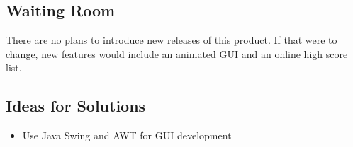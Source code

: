 \subsection{Waiting Room}
There are no plans to introduce new releases of this product. If that were to change, new features would include 
an animated GUI and an online high score list. 

\subsection{Ideas for Solutions}
\begin{itemize}
	\item Use Java Swing and AWT for GUI development
\end{itemize}

